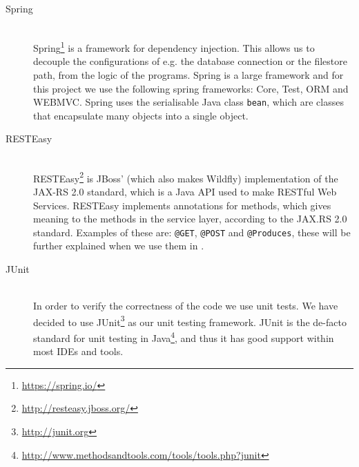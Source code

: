 \begin{description}
    \item[Spring] \hfill \\
        Spring\footnote{\url{https://spring.io/}} is a framework for dependency injection.
        This allows us to decouple the configurations of e.g. the database connection or the filestore path, from the logic of the programs.
        Spring is a large framework and for this project we use the following spring frameworks: Core, Test, ORM and WEBMVC.
        Spring uses the serialisable Java class \texttt{bean}, which are classes that encapsulate many objects into a single object.

    \item[RESTEasy] \hfill \\
        RESTEasy\footnote{\url{http://resteasy.jboss.org/}} is JBoss' (which also makes Wildfly) implementation of the JAX-RS 2.0 standard, which is a Java API used to make RESTful Web Services.
        RESTEasy implements annotations for methods, which gives meaning to the methods in the service layer, according to the JAX.RS 2.0 standard.
        Examples of these are: \texttt{@GET}, \texttt{@POST} and \texttt{@Produces}, these will be further explained when we use them in .
    
    \item[JUnit] \hfill \\
        In order to verify the correctness of the code we use unit tests.
        We have decided to use JUnit\footnote{\url{http://junit.org}} as our unit testing framework.
        JUnit is the de-facto standard for unit testing in Java\footnote{\url{http://www.methodsandtools.com/tools/tools.php?junit}}, and thus it has good support within most IDEs and tools.

\end{description}
